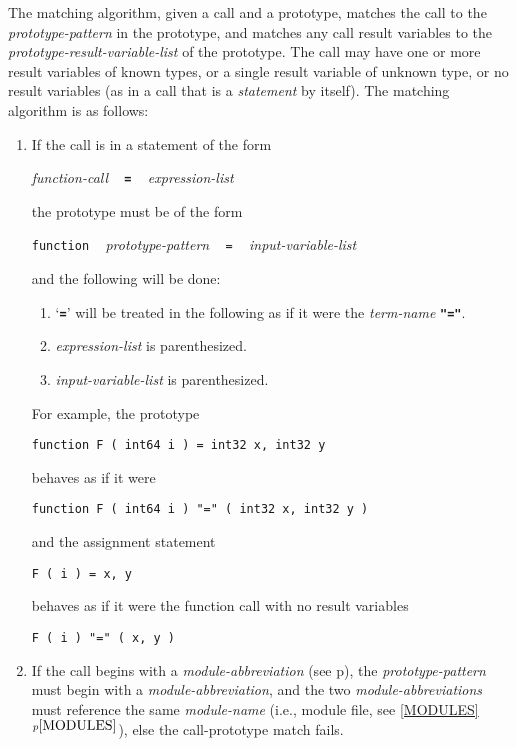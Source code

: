 \documentclass[12pt]{article}
\newcommand{\TT}[1]{{\tt \bfseries #1}}
\newcommand{\itemref}[1]{\ref{#1}$^{p\pageref{#1}}$}
\newcommand{\pagref}[1]{p\pageref{#1}}
\begin{document}
The matching algorithm, given a call and a
prototype, matches the call
to the {\em prototype-pattern} in the prototype,
and matches any call result variables to
the {\em prototype-result-variable-list}
of the prototype.  The call may have one or more result
variables of known types, or a single result variable of unknown
type, or no result variables (as in a call that is
a {\em statement} by itself).  The matching algorithm is as follows:

\begin{enumerate}

\item
If the call is in a statement of the form
\begin{center}
{\em function-call} ~ \TT{=} ~ {\em expression-list}
\end{center}
the prototype must be of the form
\begin{center}
{\tt function} ~ {\em prototype-pattern} ~ {\tt =} ~ {\em input-variable-list} \\
\end{center}
and the following will be done:
\begin{enumerate}
\item `\TT{=}' will be treated in the following as if it were the
{\em term-name} \TT{"="}.
\item{\em expression-list} is parenthesized.
\item {\em input-variable-list} is parenthesized.
\end{enumerate}

For example, the prototype
\begin{center}
\tt function F ( int64 i ) = int32 x, int32 y
\end{center}
behaves as if it were
\begin{center}
\tt function F ( int64 i ) "=" ( int32 x, int32 y )
\end{center}
and the assignment statement
\begin{center}
\tt F ( i ) = x, y
\end{center}
behaves as if it were the function call with no result variables
\begin{center}
\tt F ( i ) "=" ( x, y )
\end{center}

\item If the call begins with a {\em module-abbreviation}
(see \pagref{MODULE-ABBREVIATION}), the {\em prototype-pattern}
must begin with a {\em module-abbreviation}, and the two
{\em module-abbreviations} must reference the same {\em module-name}
(i.e., module file, see \itemref{MODULES}), else the
call-prototype match fails.


\end{enumerate}
\end{document}
